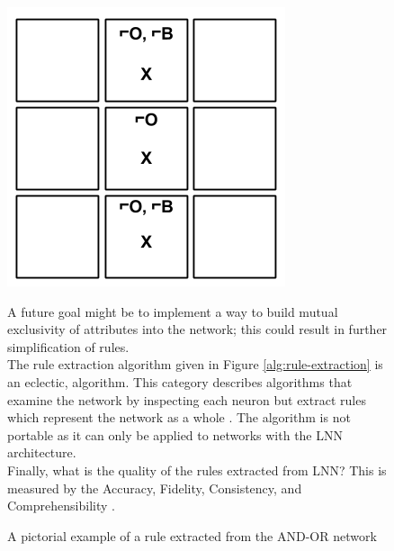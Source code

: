 \begin{figure}[H]
	\centering
	\begin{minipage}[t]{0.3\textwidth}
		\vspace{0px}
		\includegraphics[width=\textwidth]{TicTacToe-RuleExample.png}
		\caption{A pictorial example of a rule extracted from the AND-OR network}
		\label{fig:tic-tac-toe-rule-example}
	\end{minipage}
	\hspace{1cm}
	\begin{minipage}[t]{0.6\textwidth}
		\vspace{0px}
		A future goal might be to implement a way to build mutual exclusivity of attributes into the network; this could result in further simplification of rules.\\

		The rule extraction algorithm given in Figure \ref{alg:rule-extraction} is an eclectic, algorithm. This category describes algorithms that examine the network by inspecting each neuron but extract rules which represent the network as a whole \cite{tickle1998truth}. The algorithm is not portable as it can only be applied to networks with the LNN architecture.\\

	Finally, what is the quality of the rules extracted from LNN? This is measured by the Accuracy, Fidelity, Consistency, and Comprehensibility \cite{andrews1995survey}.
	\end{minipage}
	\hfill
\end{figure}

